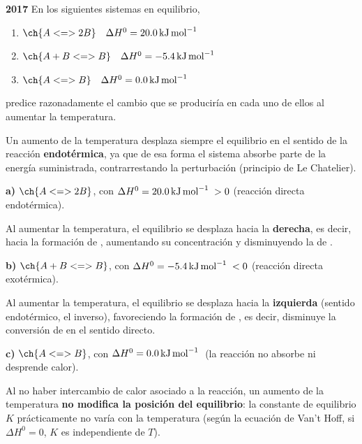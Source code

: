 \begin{exerciseEVAU}
    \textbf{2017} En los siguientes sistemas en equilibrio,
    \begin{enumerate}[label=\letraminuscula]
     \item \(\ch{A <=> 2 B}\quad \Delta H^0 = \energia[kjmol]{20.0}\)
     \item \(\ch{A + B <=>  B}\quad \Delta H^0 = \energia[kjmol]{-5.4}\)
     \item \(\ch{A <=>  B}\quad \Delta H^0 = \energia[kjmol]{0.0}\)
    \end{enumerate}
    predice razonadamente el cambio que se produciría en cada uno de ellos al aumentar la temperatura.
    \begin{solu}

        Un aumento de la temperatura desplaza siempre el equilibrio en el sentido de la reacción \textbf{endotérmica}, ya que de esa forma el sistema absorbe parte de la energía suministrada, contrarrestando la perturbación (principio de Le Chatelier).

        \textbf{a)} \(\ch{A <=> 2 B}\), con \(\Delta H^0 = \energia[kjmol]{20.0} > 0\) (reacción directa endotérmica).

        Al aumentar la temperatura, el equilibrio se desplaza hacia la \textbf{derecha}, es decir, hacia la formación de , aumentando su concentración y disminuyendo la de .

        \textbf{b)} \(\ch{A + B <=> B}\), con \(\Delta H^0 = \energia[kjmol]{-5.4} < 0\) (reacción directa exotérmica).

        Al aumentar la temperatura, el equilibrio se desplaza hacia la \textbf{izquierda} (sentido endotérmico, el inverso), favoreciendo la formación de , es decir, disminuye la conversión de  en el sentido directo.

        \textbf{c)} \(\ch{A <=> B}\), con \(\Delta H^0 = \energia[kjmol]{0.0}\) (la reacción no absorbe ni desprende calor).

        Al no haber intercambio de calor asociado a la reacción, un aumento de la temperatura \textbf{no modifica la posición del equilibrio}: la constante de equilibrio \(K\) prácticamente no varía con la temperatura (según la ecuación de Van't Hoff, si \(\Delta H^0 = 0\), \(K\) es independiente de \(T\)).

    \end{solu}
\end{exerciseEVAU}


